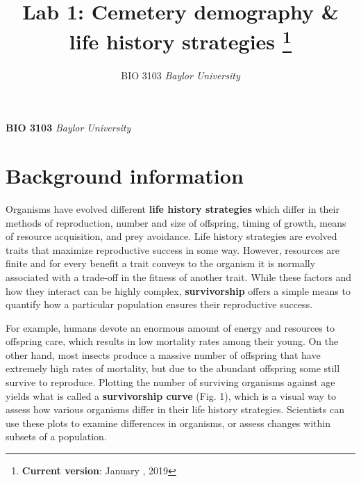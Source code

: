 \documentclass[11pt,]{article}
\title{Lab 1: Cemetery demography \& life history strategies \thanks{\textbf{Current version}: January , 2019}  }
\author{\Large BIO 3103\vspace{0.05in} \newline\normalsize\emph{Baylor University}  }
\date{}
\newcommand*{\authorfont}{\fontfamily{phv}\selectfont}
\begin{document}
	
%



{%
\setlength{\parindent}{0pt}
\thispagestyle{plain}
{\fontsize{18}{20}\selectfont\raggedright 
\maketitle  %

}

{
   \vskip 13.5pt\relax \normalsize\fontsize{11}{12} 
\textbf{\authorfont BIO 3103} \hskip 15pt \emph{\small Baylor University}   

}

}




\noindent  \hypertarget{background-information}{%
\section{Background information}\label{background-information}}

Organisms have evolved different \textbf{life history strategies} which
differ in their methods of reproduction, number and size of offspring,
timing of growth, means of resource acquisition, and prey avoidance.
Life history strategies are evolved traits that maximize reproductive
success in some way. However, resources are finite and for every benefit
a trait conveys to the organism it is normally associated with a
trade-off in the fitness of another trait. While these factors and how
they interact can be highly complex, \textbf{survivorship} offers a
simple means to quantify how a particular population ensures their
reproductive success.

For example, humans devote an enormous amount of energy and resources to
offspring care, which results in low mortality rates among their young.
On the other hand, most insects produce a massive number of offspring
that have extremely high rates of mortality, but due to the abundant
offspring some still survive to reproduce. Plotting the number of
surviving organisms against age yields what is called a
\textbf{survivorship curve} (Fig. 1), which is a visual way to assess
how various organisms differ in their life history strategies.
Scientists can use these plots to examine differences in organisms, or
assess changes within subsets of a population.
\end{document}
